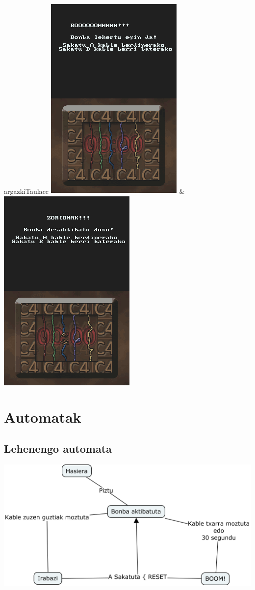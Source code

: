\documentclass[dvipsnames]{AritzhClass}
\begin{document}
\begin{taula}{}{argazkiTaula}{cc}
\includegraphics[scale=0.75]{Jokoa3} & \includegraphics[scale=0.75]{Jokoa4}
\end{taula}

\section{Automatak}

\subsection{Lehenengo automata}

\begin{center}\includegraphics[scale=0.25]{Bonba_mapa}\end{center}
\end{document}

